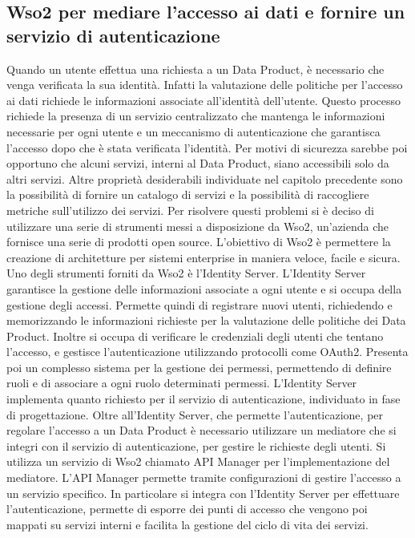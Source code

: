 \documentclass[a4paper,12pt]{report}
\begin{document}
\subsection{Wso2 per mediare l'accesso ai dati e fornire un servizio di autenticazione}
Quando un utente effettua una richiesta a un Data Product, è necessario che venga verificata la sua identità.
Infatti la valutazione delle politiche per l'accesso ai dati richiede le informazioni associate all'identità dell'utente.
Questo processo richiede la presenza di un servizio centralizzato che mantenga le informazioni necessarie per ogni utente e un meccanismo di autenticazione che garantisca l'accesso dopo che è stata verificata l'identità.
Per motivi di sicurezza sarebbe poi opportuno che alcuni servizi, interni al Data Product, siano accessibili solo da altri servizi.
Altre proprietà desiderabili individuate nel capitolo precedente sono la possibilità di fornire un catalogo di servizi e la possibilità di raccogliere metriche sull'utilizzo dei servizi.
Per risolvere questi problemi si è deciso di utilizzare una serie di strumenti messi a disposizione da Wso2, un'azienda che fornisce una serie di prodotti open source. 
L'obiettivo di Wso2 è permettere la creazione di architetture per sistemi enterprise in maniera veloce, facile e sicura.
Uno degli strumenti forniti da Wso2 è l'Identity Server.
L'Identity Server garantisce la gestione delle informazioni associate a ogni utente e si occupa della gestione degli accessi.
Permette quindi di registrare nuovi utenti, richiedendo e memorizzando le informazioni richieste per la valutazione delle politiche dei Data Product. 
Inoltre si occupa di verificare le credenziali degli utenti  che tentano l'accesso, e gestisce l'autenticazione utilizzando protocolli come OAuth2.
Presenta poi un complesso sistema per la gestione dei permessi, permettendo di definire ruoli e di associare a ogni ruolo determinati permessi.
L'Identity Server implementa quanto richiesto per il servizio di autenticazione, individuato in fase di progettazione.
Oltre all'Identity Server, che permette l'autenticazione, per regolare l'accesso a un Data Product è necessario utilizzare un mediatore che si integri con il servizio di autenticazione, per gestire le richieste degli utenti.
Si utilizza un servizio di Wso2 chiamato API Manager per l'implementazione del mediatore.
L'API Manager permette tramite configurazioni di gestire l'accesso a un servizio specifico.
In particolare si integra con l'Identity Server per effettuare l'autenticazione, permette di esporre dei punti di accesso che vengono poi mappati su servizi interni e facilita la gestione del ciclo di vita dei servizi.
\end{document}
